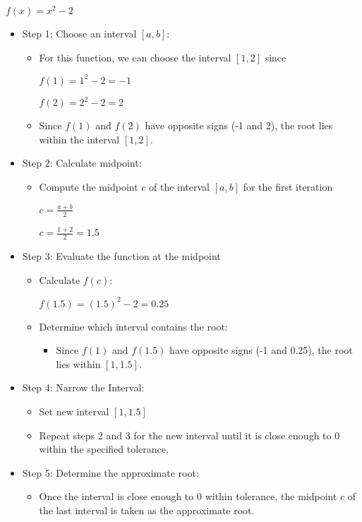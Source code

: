 \documentclass[9pt]{extarticle}
\begin{document}
\begin{center}
   $f(x) = x^2 - 2$
\end{center}
\begin{itemize}
    \item Step 1: Choose an interval $[a,b]$:
        \begin{itemize}
            \item For this function, we can choose the interval $[1, 2]$ since
            \begin{center}
            $f(1) = 1^2 - 2 = -1$

            $f(2) = 2^2 - 2 = 2$
            \end{center}
            \item Since $f(1)$ and $f(2)$ have opposite signs (-1 and 2), the root lies within the interval $[1, 2]$.
        \end{itemize}
    \item Step 2: Calculate midpoint:
        \begin{itemize}
            \item Compute the midpoint $c$ of the interval $[a,b]$ for the first iteration
            \begin{center}
                \( c = \frac{a + b}{2} \)

                \( c = \frac{1 + 2}{2} = 1.5 \)
            \end{center}
        \end{itemize}
        \item Step 3: Evaluate the function at the midpoint
            \begin{itemize}
                \item Calculate $f(c)$:
                \begin{center}
                    \(f(1.5) = (1.5)^2 - 2 = 0.25\)
                \end{center}
            \item Determine which interval contains the root:
                \begin{itemize}
                    \item Since $f(1)$ and $f(1.5)$ have opposite signs (-1 and 0.25), the root lies within $[1, 1.5]$.
                \end{itemize}
            \end{itemize}
    \item Step 4: Narrow the Interval:
        \begin{itemize}
            \item Set new interval $[1, 1.5]$
            \item Repeat steps 2 and 3 for the new interval until it is close enough to 0 within the specified tolerance.
        \end{itemize}
    \item Step 5: Determine the approximate root:
        \begin{itemize}
            \item Once the interval is close enough to 0 within tolerance, the midpoint $c$ of the last interval is taken as the approximate root.
        \end{itemize}
    \end{itemize}
    
\end{document}
